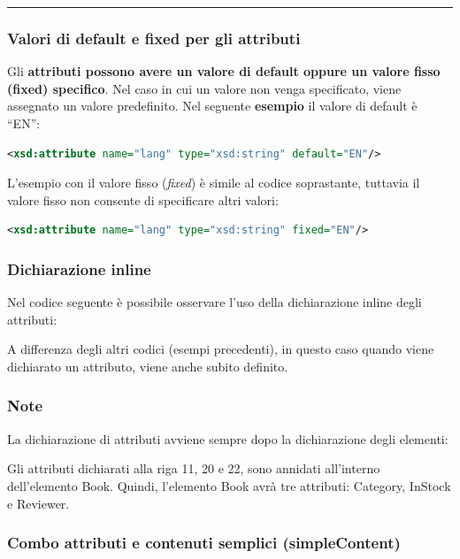 \documentclass[a4paper]{article}
\newcommand{\longline}{\noindent\rule{\textwidth}{0.4pt}}
\newcommand{\dquotes}[1]{``#1''}
\begin{document}
	\longline
	
	\subsubsection{Valori di \textsf{default} e \textsf{fixed} per gli attributi}
	
	Gli \textbf{attributi possono avere un valore di \textsf{default} oppure un valore fisso (\textsf{fixed}) specifico}. Nel caso in cui un valore non venga specificato, viene assegnato un valore predefinito. Nel seguente \textcolor{Green4}{\textbf{esempio}} il valore di \textsf{default} è \dquotes{EN}:
	\begin{lstlisting}[language=XML]
<xsd:attribute name="lang" type="xsd:string" default="EN"/>\end{lstlisting}
	L'esempio con il valore fisso (\emph{fixed}) è simile al codice soprastante, tuttavia il valore fisso non consente di specificare altri valori:
	\begin{lstlisting}[language=XML]
<xsd:attribute name="lang" type="xsd:string" fixed="EN"/>\end{lstlisting}\newpage

	\subsubsection{Dichiarazione inline}
	
	Nel codice seguente è possibile osservare l'uso della dichiarazione inline degli attributi:
	
	A differenza degli altri codici (esempi precedenti), in questo caso quando viene dichiarato un attributo, viene anche subito definito.\newpage
	
	\subsubsection{Note}
	
	La dichiarazione di attributi avviene sempre dopo la dichiarazione degli elementi:
	
	Gli attributi dichiarati alla riga 11, 20 e 22, sono annidati all'interno dell'elemento \textsf{Book}. Quindi, l'elemento \textsf{Book} avrà tre attributi: \textsf{Category}, \textsf{InStock} e \textsf{Reviewer}.
	\newpage
	
	\subsubsection{Combo attributi e contenuti semplici (\textsf{simpleContent})}
	
\end{document}
